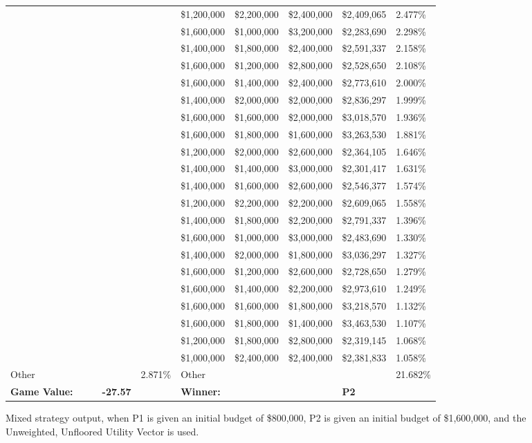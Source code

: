 \documentclass[11pt]{article}
\begin{document}
\begin{figure}
\begin{tabular}{ |p{1.0cm}p{1.0cm}p{1.0cm}p{2.0cm}|p{1.0cm}||p{1.0cm}p{1.0cm}p{1.0cm}p{2.0cm}|p{1.0cm}|}
& & & & & \$1,200,000 & \$2,200,000 & \$2,400,000 & \$2,409,065 & 2.477\% \\
& & & & & \$1,600,000 & \$1,000,000 & \$3,200,000 & \$2,283,690 & 2.298\% \\
& & & & & \$1,400,000 & \$1,800,000 & \$2,400,000 & \$2,591,337 & 2.158\% \\
& & & & & \$1,600,000 & \$1,200,000 & \$2,800,000 & \$2,528,650 & 2.108\% \\
& & & & & \$1,600,000 & \$1,400,000 & \$2,400,000 & \$2,773,610 & 2.000\% \\
& & & & & \$1,400,000 & \$2,000,000 & \$2,000,000 & \$2,836,297 & 1.999\% \\
& & & & & \$1,600,000 & \$1,600,000 & \$2,000,000 & \$3,018,570 & 1.936\% \\
& & & & & \$1,600,000 & \$1,800,000 & \$1,600,000 & \$3,263,530 & 1.881\% \\
& & & & & \$1,200,000 & \$2,000,000 & \$2,600,000 & \$2,364,105 & 1.646\% \\
& & & & & \$1,400,000 & \$1,400,000 & \$3,000,000 & \$2,301,417 & 1.631\% \\
& & & & & \$1,400,000 & \$1,600,000 & \$2,600,000 & \$2,546,377 & 1.574\% \\
& & & & & \$1,200,000 & \$2,200,000 & \$2,200,000 & \$2,609,065 & 1.558\% \\
& & & & & \$1,400,000 & \$1,800,000 & \$2,200,000 & \$2,791,337 & 1.396\% \\
& & & & & \$1,600,000 & \$1,000,000 & \$3,000,000 & \$2,483,690 & 1.330\% \\
& & & & & \$1,400,000 & \$2,000,000 & \$1,800,000 & \$3,036,297 & 1.327\% \\
& & & & & \$1,600,000 & \$1,200,000 & \$2,600,000 & \$2,728,650 & 1.279\% \\
& & & & & \$1,600,000 & \$1,400,000 & \$2,200,000 & \$2,973,610 & 1.249\% \\
& & & & & \$1,600,000 & \$1,600,000 & \$1,800,000 & \$3,218,570 & 1.132\% \\
& & & & & \$1,600,000 & \$1,800,000 & \$1,400,000 & \$3,463,530 & 1.107\% \\
& & & & & \$1,200,000 & \$1,800,000 & \$2,800,000 & \$2,319,145 & 1.068\% \\
& & & & & \$1,000,000 & \$2,400,000 & \$2,400,000 & \$2,381,833 & 1.058\% \\
\hline
Other& & & & 2.871\% & Other& & & & 21.682\%  \\
\hline
\small \textbf{Game Value:} &&& \small \textbf{-27.57} && \small \textbf{Winner:} &&& \small \textbf{P2}&\\
\hline
\end{tabular}
\caption{Mixed strategy output, when P1 is given an initial budget of \$800,000, P2 is given an initial budget of \$1,600,000, and the Unweighted, Unfloored Utility Vector is used.}
\label{8v16table.4}
\end{figure}
\end{document}
